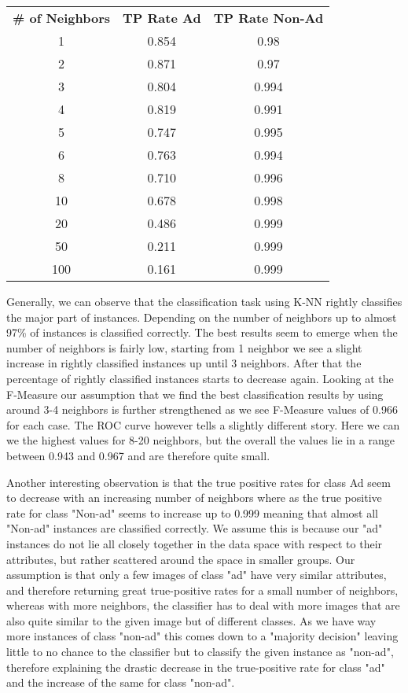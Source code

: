 \documentclass{article}
\begin{document}
\begin{center}
\begin{tabular}{ c | c | c}
\textbf{\# of Neighbors} & \textbf{TP Rate Ad} & \textbf{TP Rate Non-Ad}\\
1   & 0.854 & 0.98\\
2   & 0.871 & 0.97\\
3   & 0.804 & 0.994\\
4   & 0.819 & 0.991\\
5   & 0.747 & 0.995\\
6   & 0.763 & 0.994\\
8   & 0.710 & 0.996\\
10  & 0.678 & 0.998\\
20  & 0.486 & 0.999\\
50  & 0.211 & 0.999\\
100 & 0.161 & 0.999\\
\end{tabular}
\end{center}

Generally, we can observe that the classification task using K-NN rightly classifies the major part of instances. Depending on the number of neighbors up to almost 97\% of instances is classified correctly. The best results seem to emerge when the number of neighbors is fairly low, starting from 1 neighbor we see a slight increase in rightly classified instances up until 3 neighbors. After that the percentage of rightly classified instances starts to decrease again. Looking at the F-Measure our assumption that we find the best classification results by using around 3-4 neighbors is further strengthened as we see F-Measure values of 0.966 for each case. The ROC curve however tells a slightly different story. Here we can we the highest values for 8-20 neighbors, but the overall the values lie in a range between 0.943 and 0.967 and are therefore quite small.

Another interesting observation is that the true positive rates for class Ad seem to decrease with an increasing number of neighbors where as the true positive rate for class "Non-ad" seems to increase up to 0.999 meaning that almost all "Non-ad" instances are classified correctly. We assume this is because our "ad" instances do not lie all closely together in the data space with respect to their attributes, but rather scattered around the space in smaller groups. Our assumption is that only a few images of class "ad" have very similar attributes, and therefore returning great true-positive rates for a small number of neighbors, whereas with more neighbors, the classifier has to deal with more images that are also quite similar to the given image but of different classes. As we have way more instances of class "non-ad" this comes down to a "majority decision" leaving little to no chance to the classifier but to classify the given instance as "non-ad", therefore explaining the drastic decrease in the true-positive rate for class "ad" and the increase of the same for class "non-ad".
\end{document}
